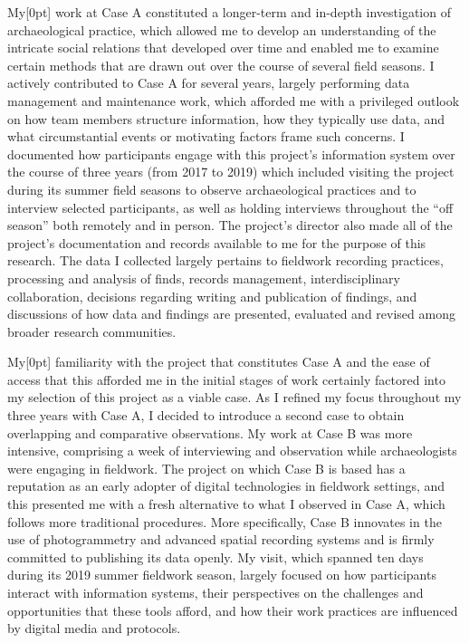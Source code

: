 \documentclass[
]{article}
\newcommand{\paragraphnumber}[1]{\marginnote{\color{lightgray}\tiny{#1}}[0pt]}
\begin{document}
My\paragraphnumber{[27]} work at Case A constituted a longer-term and
in-depth investigation of archaeological practice, which allowed me to
develop an understanding of the intricate social relations that
developed over time and enabled me to examine certain methods that are
drawn out over the course of several field seasons. I actively
contributed to Case A for several years, largely performing data
management and maintenance work, which afforded me with a privileged
outlook on how team members structure information, how they typically
use data, and what circumstantial events or motivating factors frame
such concerns. I documented how participants engage with this project's
information system over the course of three years (from 2017 to 2019)
which included visiting the project during its summer field seasons to
observe archaeological practices and to interview selected participants,
as well as holding interviews throughout the ``off season'' both
remotely and in person. The project's director also made all of the
project's documentation and records available to me for the purpose of
this research. The data I collected largely pertains to fieldwork
recording practices, processing and analysis of finds, records
management, interdisciplinary collaboration, decisions regarding writing
and publication of findings, and discussions of how data and findings
are presented, evaluated and revised among broader research communities.

My\paragraphnumber{[28]} familiarity with the project that constitutes
Case A and the ease of access that this afforded me in the initial
stages of work certainly factored into my selection of this project as a
viable case. As I refined my focus throughout my three years with Case
A, I decided to introduce a second case to obtain overlapping and
comparative observations. My work at Case B was more intensive,
comprising a week of interviewing and observation while archaeologists
were engaging in fieldwork. The project on which Case B is based has a
reputation as an early adopter of digital technologies in fieldwork
settings, and this presented me with a fresh alternative to what I
observed in Case A, which follows more traditional procedures. More
specifically, Case B innovates in the use of photogrammetry and advanced
spatial recording systems and is firmly committed to publishing its data
openly. My visit, which spanned ten days during its 2019 summer
fieldwork season, largely focused on how participants interact with
information systems, their perspectives on the challenges and
opportunities that these tools afford, and how their work practices are
influenced by digital media and protocols.
\end{document}
